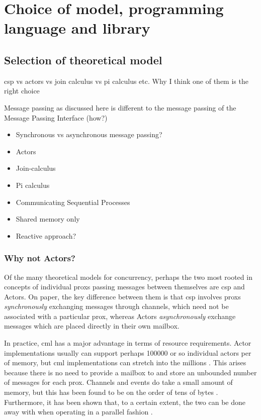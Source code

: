 \chapter{Choice of model, programming language and library}

\section{Selection of theoretical model}
\gls{csp} vs actors vs join calculus vs pi calculus etc.  Why I think one of them is the right choice

Message passing as discussed here is different to the message passing of the Message Passing Interface (how?)

\begin{itemize}
    \item Synchronous vs asynchronous message passing?
    \item Actors
    \item Join-calculus
    \item Pi calculus
    \item Communicating Sequential Processes
    \item Shared memory only
    \item Reactive approach?
\end{itemize}

\subsection{Why not Actors?}
Of the many theoretical models for concurrency, perhaps the two most rooted in concepts of individual \glspl{prox} passing messages between themselves are \gls{csp} and Actors.  On paper, the key difference between them is that \gls{csp} involves \glspl{prox} \emph{synchronously} exchanging messages through channels, which need not be associated with a particular \gls{prox}, whereas Actors \emph{asynchronously} exchange messages which are placed directly in their own mailbox.


In practice, \gls{cml} has a major advantage in terms of resource requirements.  Actor implementations usually can support perhaps \num{100 000} or so individual actors per \si{\gibi\byte} of memory, but \gls{cml} implementations can stretch into the millions \cite{Butcher2014}.  This arises because there is no need to provide a mailbox to and store an unbounded number of messages for each \gls{prox}.  Channels and events do take a small amount of memory, but this has been found to be on the order of tens of bytes \cite{Reppy1991}.  Furthermore, it has been shown that, to a certain extent, the two can be done away with when operating in a parallel fashion \cite{Reppy2007a}.

